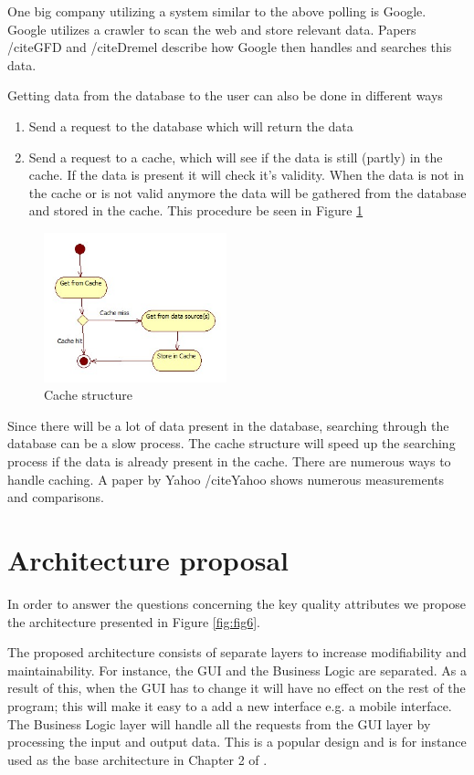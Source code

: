 \documentclass{article}
\begin{document}
One big company utilizing a system similar to the above polling is Google. Google utilizes a crawler to scan the web and store relevant data. Papers /cite{GFD} and /cite{Dremel} describe how Google then handles and searches this data.

Getting data from the database to the user can also be done in different ways
\begin{enumerate}
\item Send a request to the database which will return the data
\item Send a request to a cache, which will see if the data is still (partly) in the cache. If the data is present it will check it's validity. When the data is not in the cache or is not valid anymore the data will be gathered from the database and stored in the cache.  This procedure be seen in Figure \ref{fig:fig5}
\end{enumerate}

\begin{figure}[!]
\centering
\includegraphics[width=200px]{Cached}
\caption{Cache structure}
\label{fig:fig5}
\end{figure}

Since there will be a lot of data present in the database, searching through the database can be a slow process. The cache structure will speed up the searching process if the data is already present in the cache. There are numerous ways to handle caching. A paper by Yahoo /cite{Yahoo} shows numerous measurements and comparisons.
\section*{Architecture proposal}

In order to answer the questions concerning the key quality attributes we propose the architecture presented in Figure \ref{fig:fig6}.


The proposed architecture consists of separate layers to increase
modifiability and maintainability. For instance, the GUI and the Business Logic
are separated. As a result of this, when the GUI has to change it will have no effect on
the rest of the program; this will make it easy to a add a new interface e.g.
a mobile interface. The Business Logic layer will handle all the requests from
the GUI layer by processing the input and output data.
This is a popular design and is for instance used as the base architecture in Chapter 2 of \cite{MSDN}.
\end{document}
